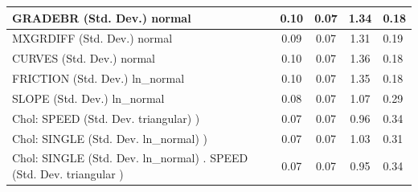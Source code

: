\begin{table}
\begin{center}
\begin{tabular}{|l|l|c|c|c|l|}
			\hline
			GRADEBR (Std. Dev.) normal &  & 0.10 & 0.07 & 1.34 & 0.18 \\
			\hline
			MXGRDIFF (Std. Dev.) normal &  & 0.09 & 0.07 & 1.31 & 0.19 \\
			\hline
			CURVES (Std. Dev.) normal &  & 0.10 & 0.07 & 1.36 & 0.18 \\
			\hline
			FRICTION (Std. Dev.) ln_normal &  & 0.10 & 0.07 & 1.35 & 0.18 \\
			\hline
			SLOPE (Std. Dev.) ln_normal &  & 0.08 & 0.07 & 1.07 & 0.29 \\
			\hline
			 Chol: SPEED (Std. Dev. triangular) ) &  & 0.07 & 0.07 & 0.96 & 0.34 \\
			\hline
			 Chol: SINGLE (Std. Dev. ln_normal) ) &  & 0.07 & 0.07 & 1.03 & 0.31 \\
			\hline
			 Chol: SINGLE (Std. Dev. ln_normal) . SPEED (Std. Dev.   triangular ) &  & 0.07 & 0.07 & 0.95 & 0.34 \\
			\hline
		\end{tabular}
	\end{center}
\end{table}